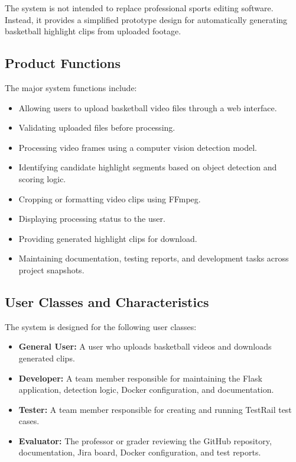 \documentclass[12pt]{article}
\begin{document}
The system is not intended to replace professional sports editing software. Instead, it provides a simplified prototype design for automatically generating basketball highlight clips from uploaded footage.

\subsection{Product Functions}
The major system functions include:
\begin{itemize}[noitemsep]
    \item Allowing users to upload basketball video files through a web interface.
    \item Validating uploaded files before processing.
    \item Processing video frames using a computer vision detection model.
    \item Identifying candidate highlight segments based on object detection and scoring logic.
    \item Cropping or formatting video clips using FFmpeg.
    \item Displaying processing status to the user.
    \item Providing generated highlight clips for download.
    \item Maintaining documentation, testing reports, and development tasks across project snapshots.
\end{itemize}

\subsection{User Classes and Characteristics}
The system is designed for the following user classes:

\begin{itemize}[noitemsep]
    \item \textbf{General User:} A user who uploads basketball videos and downloads generated clips.
    \item \textbf{Developer:} A team member responsible for maintaining the Flask application, detection logic, Docker configuration, and documentation.
    \item \textbf{Tester:} A team member responsible for creating and running TestRail test cases.
    \item \textbf{Evaluator:} The professor or grader reviewing the GitHub repository, documentation, Jira board, Docker configuration, and test reports.
\end{itemize}
\end{document}
